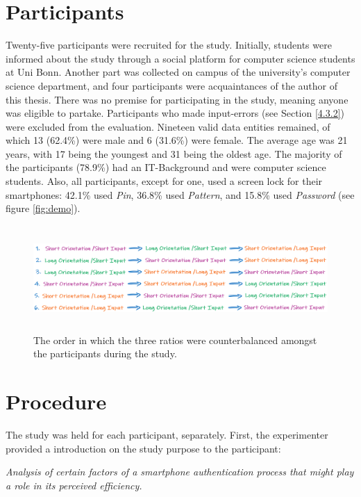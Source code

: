 \section{Participants} \label{5.2}

Twenty-five participants were recruited for the study. Initially, students were informed about the study through a social platform for computer science students at Uni Bonn. Another part was collected on campus of the university's computer science department, and four participants were acquaintances of the author of this thesis. There was no premise for participating in the study, meaning anyone was eligible to partake. Participants who made input-errors (see Section \ref{4.3.2}) were excluded from the evaluation. Nineteen valid data entities remained, of which 13 (62.4\%) were male and 6 (31.6\%) were female. The average age was 21 years, with 17 being the youngest and 31 being the oldest age. The majority of the participants (78.9\%) had an IT-Background and were computer science students. Also, all participants, except for one, used a screen lock for their smartphones: 42.1\% used \textit{Pin}, 36.8\% used \textit{Pattern}, and 15.8\% used \textit{Password} (see figure \ref{fig:demo}). 

\begin{figure}[t!]
\centering
\includegraphics[width=14cm, height=4cm]{Chapters/graphics/permutation.PNG}
\caption{The order in which the three ratios were counterbalanced amongst the participants during the study.}
\label{fig:permutation}
\end{figure}


\section{Procedure} \label{5.3}
The study was held for each participant, separately. First, the experimenter provided a introduction on the study purpose to the participant:

\begin{center}
\textit{Analysis of certain factors of a smartphone authentication process that might play a role in its perceived efficiency.}    
\end{center}

